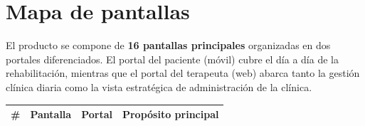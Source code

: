 \section{Mapa de pantallas}

El producto se compone de \textbf{16 pantallas principales} organizadas en dos portales diferenciados. El portal del paciente (móvil) cubre el día a día de la rehabilitación, mientras que el portal del terapeuta (web) abarca tanto la gestión clínica diaria como la vista estratégica de administración de la clínica.

\begin{longtable}{L{1cm} L{4.5cm} L{2.8cm} L{6.5cm}}
  \toprule
  \textbf{\color{fmAccent}\#} &
  \textbf{\color{fmAccent}Pantalla} &
  \textbf{\color{fmAccent}Portal} &
  \textbf{\color{fmAccent}Propósito principal} \\
  \midrule
  \endhead


\end{longtable}
